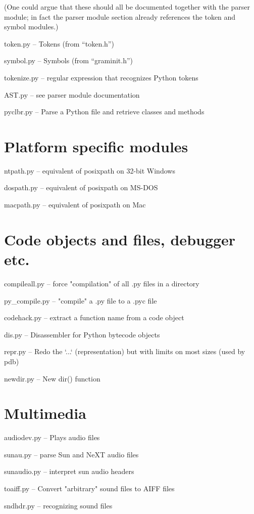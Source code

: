 (One could argue that these should all be documented together with the
parser module; in fact the parser module section already references
the token and symbol modules.)

token.py -- Tokens (from ``token.h'')

symbol.py -- Symbols (from ``graminit.h'')

tokenize.py -- regular expression that recognizes Python tokens

AST.py -- see parser module documentation

pyclbr.py -- Parse a Python file and retrieve classes and methods


\section{Platform specific modules}

ntpath.py -- equivalent of posixpath on 32-bit Windows

dospath.py -- equivalent of posixpath on MS-DOS

macpath.py -- equivalent of posixpath on Mac


\section{Code objects and files, debugger etc.}

compileall.py -- force "compilation" of all .py files in a directory

py_compile.py -- "compile" a .py file to a .pyc file

codehack.py -- extract a function name from a code object

dis.py -- Disassembler for Python bytecode objects

repr.py -- Redo the `...` (representation) but with limits on most
sizes (used by pdb)

newdir.py -- New dir() function


\section{Multimedia}

audiodev.py -- Plays audio files

sunau.py -- parse Sun and NeXT audio files

sunaudio.py -- interpret sun audio headers

toaiff.py -- Convert "arbitrary" sound files to AIFF files

sndhdr.py -- recognizing sound files

